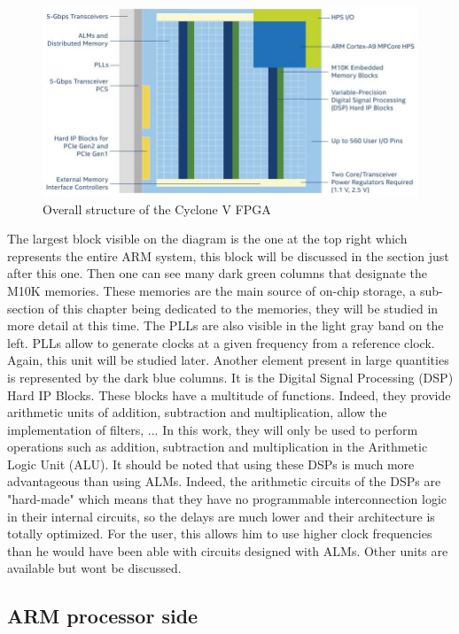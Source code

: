 \begin{figure}[H]
    \centering
    \includegraphics[scale=0.6]{Chapter1-Hardware/res/cycv_structure.PNG}
    \caption{Overall structure 
    of the Cyclone V FPGA}
    \label{fig:cyc5/structure}
\end{figure}

The largest block visible on the diagram is the one at the top right which represents the entire ARM
system, this block will be discussed in the section just after this one. Then one can see many dark 
green columns that designate the M10K memories. These memories are the main source of on-chip 
storage, a sub-section of this chapter being dedicated to the memories, they will be studied in more 
detail at this time. The PLLs are also visible in the light gray band on the left. PLLs allow to 
generate clocks at a given frequency from a reference clock. Again, this unit will be studied later. 
Another element present in large quantities is represented by the dark blue columns. It is the 
Digital Signal Processing (DSP) Hard IP Blocks. These blocks have a multitude of functions. Indeed, 
they provide arithmetic units of addition, subtraction and multiplication, allow the implementation 
of filters, ... In this work, they will only be used to perform operations such as addition, 
subtraction and multiplication in the Arithmetic Logic Unit (ALU). It should be noted that using 
these DSPs is much more advantageous than using ALMs. Indeed, the arithmetic circuits of the DSPs 
are "hard-made" which means that they have no programmable interconnection logic in their internal 
circuits, so the delays are much lower and their architecture is totally optimized. For the user, 
this allows him to use higher clock frequencies than he would have been able with circuits designed
with ALMs. Other units are available but wont be discussed.

\subsection{ARM processor side}

